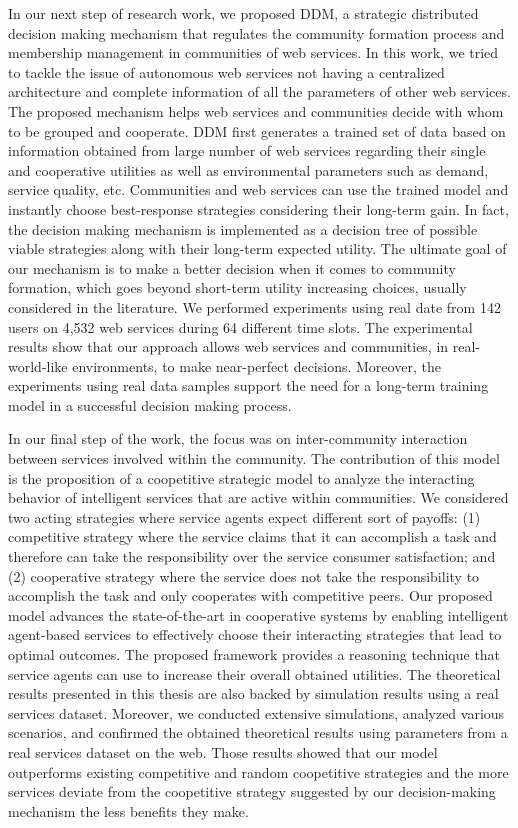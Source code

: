In our next step of research work, we proposed DDM, a strategic distributed decision making mechanism that regulates the community formation process and membership management in communities of web services. In this work, we tried to tackle the issue of autonomous web services not having a centralized architecture and complete information of all the parameters of other web services. The proposed mechanism helps web services and communities decide with whom to be grouped and cooperate. DDM first generates a trained set of data based on information obtained from large number of web services regarding their single and cooperative utilities as well as environmental parameters such as demand, service quality, etc. Communities and web services can use the trained model and instantly choose best-response strategies considering their long-term gain. In fact, the decision making mechanism is implemented as a decision tree of possible viable strategies along with their long-term expected utility. The ultimate goal of our mechanism is to make a better decision when it comes to community formation, which goes beyond short-term utility increasing choices, usually considered in the literature. We performed experiments using real date from 142 users on 4,532 web services during 64 different time slots. The experimental results show that our approach allows web services and communities, in real-world-like environments, to make near-perfect decisions. Moreover, the experiments using real data samples support the need for a long-term training model in a successful decision making process.

In our final step of the work, the focus was on inter-community interaction between services involved within the community. The contribution of this model is the proposition of a coopetitive strategic model to analyze the interacting behavior of intelligent services that are active within communities. We considered two acting strategies where service agents expect different sort of payoffs: (1) competitive strategy where the service claims that it can accomplish a task and therefore can take the responsibility over the service consumer satisfaction; and (2) cooperative strategy where the service does not take the responsibility to accomplish the task and only cooperates with competitive peers. Our proposed model advances the state-of-the-art in cooperative systems by enabling intelligent agent-based services to effectively choose their interacting strategies that lead to optimal outcomes. The proposed framework provides a reasoning technique that service agents can use to increase their overall obtained utilities. The theoretical results presented in this thesis are also backed by simulation results using a real services dataset. Moreover, we conducted extensive simulations, analyzed various scenarios, and confirmed the obtained theoretical results using parameters from a real services dataset on the web. Those results showed that our model outperforms existing competitive and random coopetitive strategies and the more
services deviate from the coopetitive strategy suggested by our decision-making mechanism the less benefits they make.


